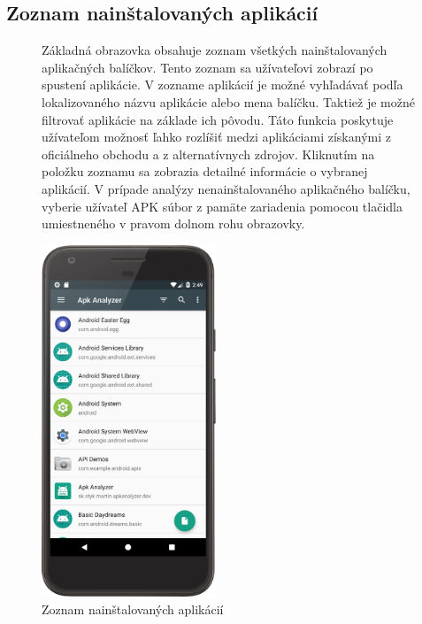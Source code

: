 \subsection{Zoznam nainštalovaných aplikácií}
\begin{figure}[H]
\begin{minipage}[t]{0.48\textwidth}
Základná obrazovka obsahuje zoznam všetkých nainštalovaných aplikačných balíčkov. Tento zoznam sa užívateľovi zobrazí po spustení aplikácie. V zozname aplikácií je možné vyhľadávať podľa lokalizovaného názvu aplikácie alebo mena balíčku. Taktiež je možné filtrovať aplikácie na základe ich pôvodu. Táto funkcia poskytuje užívateľom možnosť ľahko rozlíšiť medzi aplikáciami získanými z oficiálneho obchodu a z alternatívnych zdrojov. Kliknutím na položku zoznamu sa zobrazia detailné informácie o vybranej aplikácií. V prípade analýzy nenainštalovaného aplikačného balíčku, vyberie užívateľ APK súbor z pamäte zariadenia pomocou tlačidla umiestneného v pravom dolnom rohu obrazovky.
\end{minipage}%
\hfill
\centering
\begin{minipage}[t][][b]{0.45\textwidth}
\centering
\includegraphics[width=5.2cm]{images/app/list_device.png}
\centering
\caption{Zoznam nainštalovaných aplikácií}
\label{fig:app-list}
\end{minipage}%
\end{figure}

